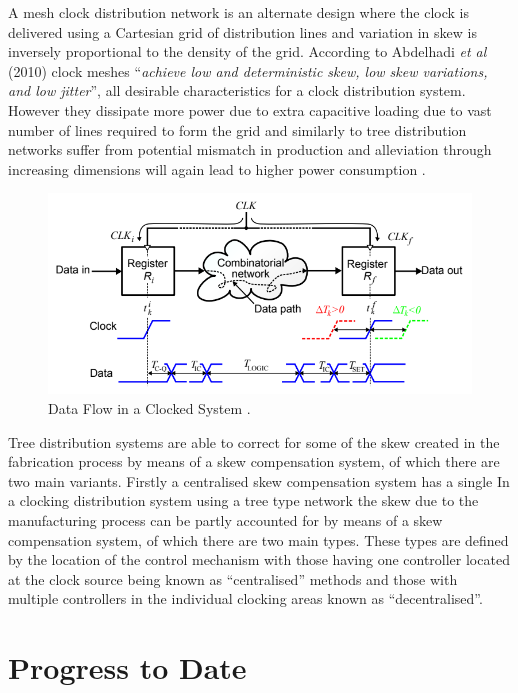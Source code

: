 \documentclass[12pt,english,british]{report}
\begin{document}
A mesh clock distribution network is an alternate design where the clock is delivered using a Cartesian grid of distribution lines and variation in skew is inversely proportional to the density of the grid. According to Abdelhadi \textit{et al} (2010) clock meshes ``\textit{achieve low and deterministic skew, low skew variations, and low jitter}'', all desirable characteristics for a clock distribution system. However they dissipate more power due to extra capacitive loading due to vast number of lines required to form the grid and similarly to tree distribution networks suffer from potential mismatch in production and alleviation through increasing dimensions will again lead to higher power consumption \cite{abdelhadi2010timing}. 
\begin{figure}[h]
	\centering
	\includegraphics[scale=0.5]{../eldar_why_precise_clocking}
	\caption{Data Flow in a Clocked System \cite{zianbetov2013distributed}.}%
	\label{fig:mesh}
\end{figure}

Tree distribution systems are able to correct for some of the skew created in the fabrication process by means of a skew compensation system, of which there are two main variants. Firstly a centralised skew compensation system has a single 
In a clocking distribution system using a tree type network the skew due to the manufacturing process can be partly accounted for by means of a skew compensation system, of which there are two main types. These types are defined by the location of the control mechanism with those having one controller located at the clock source being known as ``centralised'' methods and those with multiple controllers in the individual clocking areas known as ``decentralised''.










\chapter{Progress to Date}



\newpage
 

\end{document}
